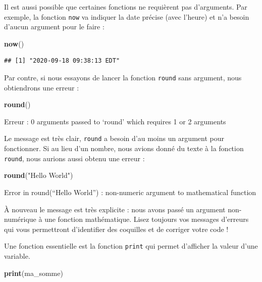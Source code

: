 \documentclass[
  11pt,
  french,
]{book}
\makeatletter
\newenvironment{Shaded}{\begin{snugshade}}{\end{snugshade}}
\newcommand{\KeywordTok}[1]{\textcolor[rgb]{0.13,0.29,0.53}{\textbf{#1}}}
\newcommand{\NormalTok}[1]{#1}
\newcommand{\StringTok}[1]{\textcolor[rgb]{0.31,0.60,0.02}{#1}}
\newenvironment{kframe}{%
\medskip{}
\setlength{\fboxsep}{.8em}
 \def\at@end@of@kframe{}%
 \ifinner\ifhmode%
  \def\at@end@of@kframe{\end{minipage}}%
  \begin{minipage}{\columnwidth}%
 \fi\fi%
 \def\FrameCommand##1{\hskip\@totalleftmargin \hskip-\fboxsep
 \colorbox{shadecolor}{##1}\hskip-\fboxsep
     \hskip-\linewidth \hskip-\@totalleftmargin \hskip\columnwidth}%
 \MakeFramed {\advance\hsize-\width
   \@totalleftmargin\z@ \linewidth\hsize
   \@setminipage}}%
 {\par\unskip\endMakeFramed%
 \at@end@of@kframe}
\renewenvironment{Shaded}{\begin{kframe}}{\end{kframe}}
\makeatother
\begin{document}
Il est aussi possible que certaines fonctions ne requièrent pas d'arguments. Par exemple, la fonction \texttt{now} va indiquer la date précise (avec l'heure) et n'a besoin d'aucun argument pour le faire :

\begin{Shaded}
\begin{Highlighting}[]
\KeywordTok{now}\NormalTok{()}
\end{Highlighting}
\end{Shaded}

\begin{verbatim}
## [1] "2020-09-18 09:38:13 EDT"
\end{verbatim}

Par contre, si nous essayons de lancer la fonction \texttt{round} sans argument, nous obtiendrons une erreur :

\begin{Shaded}
\begin{Highlighting}[]
\KeywordTok{round}\NormalTok{()}
\end{Highlighting}
\end{Shaded}

{Erreur : 0 arguments passed to `round' which requires 1 or 2 arguments}

Le message est très clair, \texttt{round} a besoin d'au moins un argument pour fonctionner. Si au lieu d'un nombre, nous avions donné du texte à la fonction \texttt{round}, nous aurions aussi obtenu une erreur :

\begin{Shaded}
\begin{Highlighting}[]
\KeywordTok{round}\NormalTok{(}\StringTok{"Hello World"}\NormalTok{)}
\end{Highlighting}
\end{Shaded}

{Error in round(``Hello World'') :
non-numeric argument to mathematical function}

À nouveau le message est très explicite : nous avons passé un argument non-numérique à une fonction mathématique. Lisez toujours vos messages d'erreurs qui vous permettront d'identifier des coquilles et de corriger votre code !

Une fonction essentielle est la fonction \texttt{print} qui permet d'afficher la valeur d'une variable.

\begin{Shaded}
\begin{Highlighting}[]
\KeywordTok{print}\NormalTok{(ma_somme)}
\end{Highlighting}
\end{Shaded}
\end{document}
